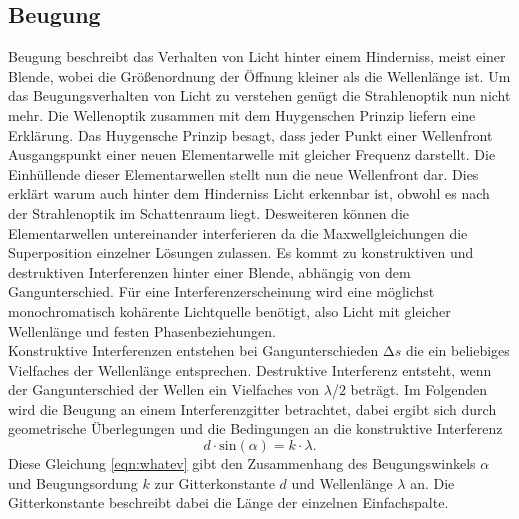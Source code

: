 \subsection{Beugung}
Beugung beschreibt das Verhalten von Licht hinter einem Hinderniss, meist einer Blende, wobei die Größenordnung der Öffnung kleiner als die Wellenlänge ist.
Um das Beugungsverhalten von Licht zu verstehen genügt die Strahlenoptik nun nicht mehr. Die Wellenoptik zusammen mit dem Huygenschen Prinzip liefern eine Erklärung. Das Huygensche Prinzip besagt, dass jeder Punkt einer Wellenfront
Ausgangspunkt einer neuen Elementarwelle mit gleicher Frequenz darstellt. Die Einhüllende dieser Elementarwellen stellt nun die neue Wellenfront dar. Dies erklärt warum auch hinter dem Hinderniss Licht erkennbar ist, obwohl es 
nach der Strahlenoptik im Schattenraum liegt. Desweiteren können die Elementarwellen untereinander interferieren da die Maxwellgleichungen die Superposition einzelner Lösungen zulassen. Es kommt zu konstruktiven und destruktiven
Interferenzen hinter einer Blende, abhängig von dem Gangunterschied. Für eine Interferenzerscheinung wird eine möglichst monochromatisch kohärente Lichtquelle benötigt, also Licht mit gleicher Wellenlänge und festen Phasenbeziehungen.
\\
Konstruktive Interferenzen entstehen bei Gangunterschieden $\increment s$ die ein beliebiges Vielfaches der Wellenlänge entsprechen. Destruktive Interferenz entsteht, wenn der Gangunterschied der Wellen ein Vielfaches von $\lambda$/$2$ beträgt.
Im Folgenden wird die Beugung an einem Interferenzgitter betrachtet, dabei ergibt sich durch geometrische Überlegungen und die Bedingungen an die konstruktive Interferenz
\begin{equation}
    \label{eqn:whatev}
d \cdot \text{sin}(\alpha) = k \cdot \lambda.
\end{equation}
Diese Gleichung \eqref{eqn:whatev} gibt den Zusammenhang des Beugungswinkels $\alpha$ und Beugungsordung $k$ zur Gitterkonstante $d$ und Wellenlänge $\lambda$ an. Die Gitterkonstante beschreibt dabei die Länge der einzelnen Einfachspalte.
